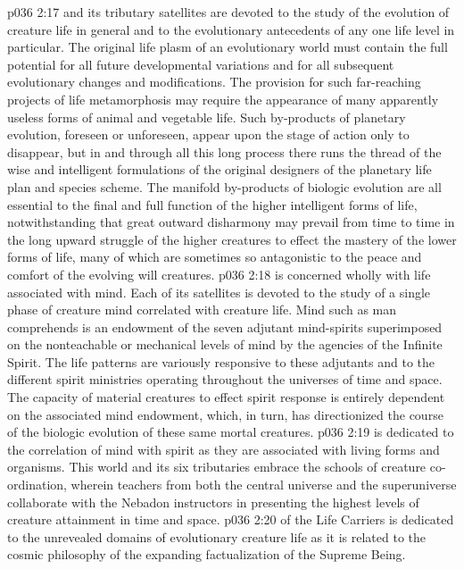 \pc \vs p036 2:17  and its tributary satellites are devoted to the study of the evolution of creature life in general and to the evolutionary antecedents of any one life level in particular. The original life plasm of an evolutionary world must contain the full potential for all future developmental variations and for all subsequent evolutionary changes and modifications. The provision for such far\hyp{}reaching projects of life metamorphosis may require the appearance of many apparently useless forms of animal and vegetable life. Such by\hyp{}products of planetary evolution, foreseen or unforeseen, appear upon the stage of action only to disappear, but in and through all this long process there runs the thread of the wise and intelligent formulations of the original designers of the planetary life plan and species scheme. The manifold by\hyp{}products of biologic evolution are all essential to the final and full function of the higher intelligent forms of life, notwithstanding that great outward disharmony may prevail from time to time in the long upward struggle of the higher creatures to effect the mastery of the lower forms of life, many of which are sometimes so antagonistic to the peace and comfort of the evolving will creatures.
\pc \vs p036 2:18  is concerned wholly with life associated with mind. Each of its satellites is devoted to the study of a single phase of creature mind correlated with creature life. Mind such as man comprehends is an endowment of the seven adjutant mind\hyp{}spirits superimposed on the nonteachable or mechanical levels of mind by the agencies of the Infinite Spirit. The life patterns are variously responsive to these adjutants and to the different spirit ministries operating throughout the universes of time and space. The capacity of material creatures to effect spirit response is entirely dependent on the associated mind endowment, which, in turn, has directionized the course of the biologic evolution of these same mortal creatures.\plusone
\pc \vs p036 2:19  is dedicated to the correlation of mind with spirit as they are associated with living forms and organisms. This world and its six tributaries embrace the schools of creature co\hyp{}ordination, wherein teachers from both the central universe and the superuniverse collaborate with the Nebadon instructors in presenting the highest levels of creature attainment in time and space.
\pc \vs p036 2:20  of the Life Carriers is dedicated to the unrevealed domains of evolutionary creature life as it is related to the cosmic philosophy of the expanding factualization of the Supreme Being.
